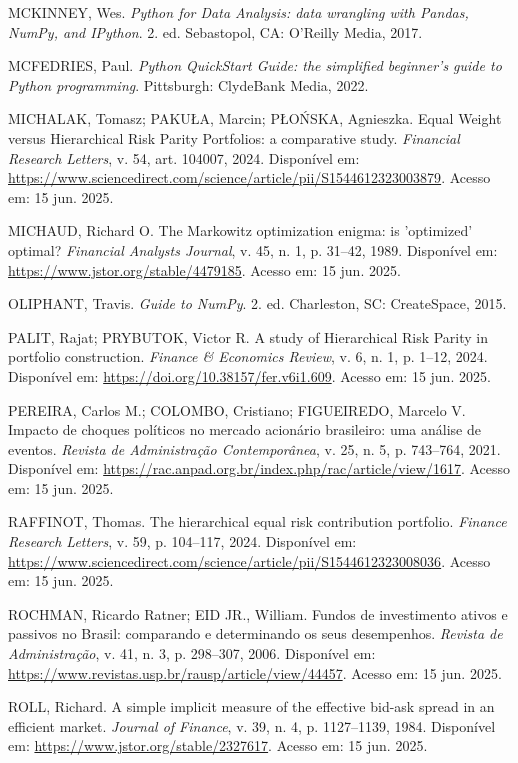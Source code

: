 \noindent
MCKINNEY, Wes. \textit{Python for Data Analysis: data wrangling with Pandas, NumPy, and IPython}. 2. ed. Sebastopol, CA: O'Reilly Media, 2017.

\noindent
MCFEDRIES, Paul. \textit{Python QuickStart Guide: the simplified beginner's guide to Python programming}. Pittsburgh: ClydeBank Media, 2022.

\noindent
MICHALAK, Tomasz; PAKUŁA, Marcin; PŁOŃSKA, Agnieszka. Equal Weight versus Hierarchical Risk Parity Portfolios: a comparative study. \textit{Financial Research Letters}, v. 54, art. 104007, 2024. Disponível em: \url{https://www.sciencedirect.com/science/article/pii/S1544612323003879}. Acesso em: 15 jun. 2025.

\noindent
MICHAUD, Richard O. The Markowitz optimization enigma: is 'optimized' optimal? \textit{Financial Analysts Journal}, v. 45, n. 1, p. 31--42, 1989. Disponível em: \url{https://www.jstor.org/stable/4479185}. Acesso em: 15 jun. 2025.

\noindent
OLIPHANT, Travis. \textit{Guide to NumPy}. 2. ed. Charleston, SC: CreateSpace, 2015.

\noindent
PALIT, Rajat; PRYBUTOK, Victor R. A study of Hierarchical Risk Parity in portfolio construction. \textit{Finance \& Economics Review}, v. 6, n. 1, p. 1--12, 2024. Disponível em: \url{https://doi.org/10.38157/fer.v6i1.609}. Acesso em: 15 jun. 2025.

\noindent
PEREIRA, Carlos M.; COLOMBO, Cristiano; FIGUEIREDO, Marcelo V. Impacto de choques políticos no mercado acionário brasileiro: uma análise de eventos. \textit{Revista de Administração Contemporânea}, v. 25, n. 5, p. 743--764, 2021. Disponível em: \url{https://rac.anpad.org.br/index.php/rac/article/view/1617}. Acesso em: 15 jun. 2025.

\noindent
RAFFINOT, Thomas. The hierarchical equal risk contribution portfolio. \textit{Finance Research Letters}, v. 59, p. 104--117, 2024. Disponível em: \url{https://www.sciencedirect.com/science/article/pii/S1544612323008036}. Acesso em: 15 jun. 2025.

\noindent
ROCHMAN, Ricardo Ratner; EID JR., William. Fundos de investimento ativos e passivos no Brasil: comparando e determinando os seus desempenhos. \textit{Revista de Administração}, v. 41, n. 3, p. 298--307, 2006. Disponível em: \url{https://www.revistas.usp.br/rausp/article/view/44457}. Acesso em: 15 jun. 2025.

\noindent
ROLL, Richard. A simple implicit measure of the effective bid-ask spread in an efficient market. \textit{Journal of Finance}, v. 39, n. 4, p. 1127--1139, 1984. Disponível em: \url{https://www.jstor.org/stable/2327617}. Acesso em: 15 jun. 2025.

